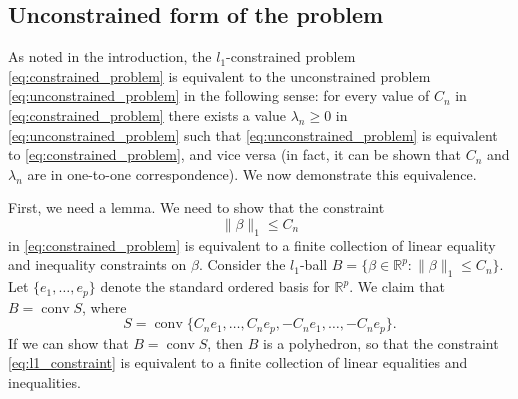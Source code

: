 \documentclass[letterpaper,12pt]{article}
\DeclareMathOperator{\conv}{conv}
\newcommand{\norm}[1]{\lVert#1\rVert}
\begin{document}
\subsection*{Unconstrained form of the problem}

As noted in the introduction, the $l_1$-constrained problem
\eqref{eq:constrained_problem} is equivalent to the unconstrained
problem \eqref{eq:unconstrained_problem} in the following sense: for
every value of $C_n$ in \eqref{eq:constrained_problem} there exists a
value $\lambda_n \geq 0$ in \eqref{eq:unconstrained_problem} such that
\eqref{eq:unconstrained_problem} is equivalent to
\eqref{eq:constrained_problem}, and vice versa (in fact, it can be
shown that $C_n$ and $\lambda_n$ are in one-to-one correspondence). We
now demonstrate this equivalence.

First, we need a lemma. We need to show that the constraint
\begin{equation} \label{eq:l1_constraint}
  \norm{\beta}_1 \leq C_n
\end{equation}
in \eqref{eq:constrained_problem} is equivalent to a finite collection
of linear equality and inequality constraints on $\beta$. Consider the
$l_1$-ball $B = \{\beta \in \mathbb{R}^p : \norm{\beta}_1 \leq
C_n\}$. Let $\{e_1, \ldots, e_p\}$ denote the standard ordered basis
for $\mathbb{R}^p$. We claim that $B = \conv S$, where
\begin{equation*}
  S = \conv\{C_n e_1, \ldots, C_n e_p, -C_n e_1, \ldots, -C_n e_p\}.
\end{equation*}
If we can show that $B = \conv S$, then $B$ is a polyhedron, so that
the constraint \eqref{eq:l1_constraint} is equivalent to a finite
collection of linear equalities and inequalities.
\end{document}
